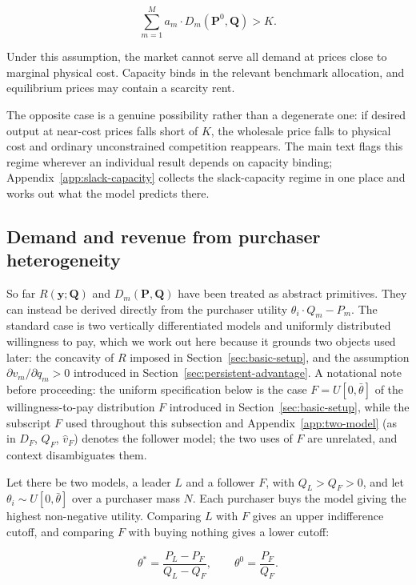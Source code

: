 \documentclass[11pt]{article}
\begin{document}
\begin{equation}\sum_{m=1}^{M}a_m\cdot D_m(\mathbf P^0,\mathbf Q)>K.\end{equation}

Under this assumption, the market cannot serve all demand at prices close to marginal physical cost. Capacity binds in the relevant benchmark allocation, and equilibrium prices may contain a scarcity rent.

The opposite case is a genuine possibility rather than a degenerate one: if desired output at near-cost prices falls short of $K$, the wholesale price falls to physical cost and ordinary unconstrained competition reappears. The main text flags this regime wherever an individual result depends on capacity binding; Appendix~\ref{app:slack-capacity} collects the slack-capacity regime in one place and works out what the model predicts there.

\subsection{Demand and revenue from purchaser heterogeneity}
\label{subsec:two-model-demand}

So far $R(\mathbf y;\mathbf Q)$ and $D_m(\mathbf P,\mathbf Q)$ have been treated as abstract primitives. They can instead be derived directly from the purchaser utility $\theta_i\cdot Q_m-P_m$. The standard case is two vertically differentiated models and uniformly distributed willingness to pay, which we work out here because it grounds two objects used later: the concavity of $R$ imposed in Section~\ref{sec:basic-setup}, and the assumption $\partial v_m/\partial q_m>0$ introduced in Section~\ref{sec:persistent-advantage}. A notational note before proceeding: the uniform specification below is the case $F=U[0,\bar\theta]$ of the willingness-to-pay distribution $F$ introduced in Section~\ref{sec:basic-setup}, while the subscript $F$ used throughout this subsection and Appendix~\ref{app:two-model} (as in $D_F$, $Q_F$, $\widehat v_F$) denotes the follower model; the two uses of $F$ are unrelated, and context disambiguates them.

Let there be two models, a leader $L$ and a follower $F$, with $Q_L>Q_F>0$, and let $\theta_i\sim U[0,\bar\theta]$ over a purchaser mass $N$. Each purchaser buys the model giving the highest non-negative utility. Comparing $L$ with $F$ gives an upper indifference cutoff, and comparing $F$ with buying nothing gives a lower cutoff:

\begin{equation}\theta^{*}=\frac{P_L-P_F}{Q_L-Q_F},\qquad \theta^{0}=\frac{P_F}{Q_F}.\end{equation}
\end{document}
